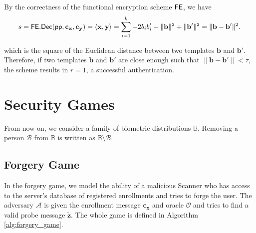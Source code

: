 By the correctness of the functional encryption scheme $\sf FE$, we have
\[
	s = {\sf FE.Dec}({\sf pp}, \mathbf{c_x}, \mathbf{c_y}) = \langle \mathbf{x}, \mathbf{y} \rangle = \sum_{i=1}^k -2b_ib_i' + \|\mathbf{b}\|^2 + \|\mathbf{b'}\|^2 = \| \mathbf{b} - \mathbf{b'} \|^2.
\]

which is the square of the Euclidean distance between two templates $\mathbf{b}$ and $\mathbf{b}'$. Therefore, if two templates $\mathbf{b}$ and $\mathbf{b}'$ are close enough such that $\|\mathbf{b} - \mathbf{b'}\| < \tau$, the scheme results in $r = 1$, a successful authentication.



\section{Security Games}

From now on, we consider a family of biometric distributions $\mathbb{B}$. Removing a person $\mathcal{B}$ from $\mathbb{B}$ is written as $\mathbb{B} \setminus \mathcal{B}$.

\subsection{Forgery Game}
\label{sec:forgery_game}

In the forgery game, we model the ability of a malicious {\sf Scanner} who has access to the server's database of registered enrollments and tries to forge the user. The adversary $\mathcal{A}$ is given the enrollment message $\mathbf{c_x}$ and oracle $\mathcal{O}$ and tries to find a valid probe message $\mathbf{\tilde{z}}$. The whole game is defined in Algorithm \ref{alg:forgery_game}.


